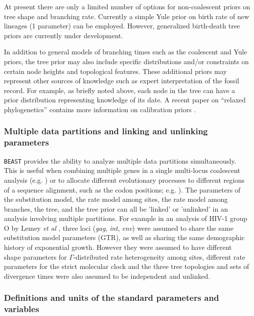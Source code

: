 \documentclass[cup7b, english]{cupbook}
\begin{document}
At present there are only a limited number of options for non-coalescent
priors on tree shape and branching rate. Currently a simple Yule prior
on birth rate of new lineages (1 parameter) can be employed. However,
generalized birth-death tree priors are currently under development.

In addition to general models of branching times such as the coalescent
and Yule priors, the tree prior may also include specific distributions
and/or constraints on certain node heights and topological features.
These additional priors may represent other sources of knowledge such
as expert interpretation of the fossil record. For example, as briefly
noted above, each node in the tree can have a prior distribution representing
knowledge of its date. A recent paper on ``relaxed phylogenetics''
contains more information on calibration priors \cite{DHPR2006}.

\subsubsection{Multiple data partitions and linking and unlinking parameters}

\texttt{BEAST} provides the ability to analyze multiple data partitions simultaneously.
This is useful when combining multiple genes in a single multi-locus
coalescent analysis (e.g. \cite{Lemeyetal2004}) or to allocate different
evolutionary processes to different regions of a sequence alignment, such as the codon positions; e.g. \cite{PDNRR2003}). The parameters
of the substitution model, the rate model among sites, the rate model
among branches, the tree, and the tree prior can all be 'linked' or
'unlinked' in an analysis involving multiple partitions. For example
in an analysis of HIV-1 group O by Lemey \emph{et al} \cite{Lemeyetal2004},
three loci ({\it gag}, {\it int}, {\it env}) were assumed to share the same substitution
model parameters (GTR), as well as sharing the same demographic history
of exponential growth. However they were assumed to have different
shape parameters for $\Gamma$-distributed rate heterogeneity among
sites, different rate parameters for the strict molecular clock and
the three tree topologies and sets of divergence times were also assumed
to be independent and unlinked.

\subsubsection{Definitions and units of the standard parameters and variables}
\end{document}
